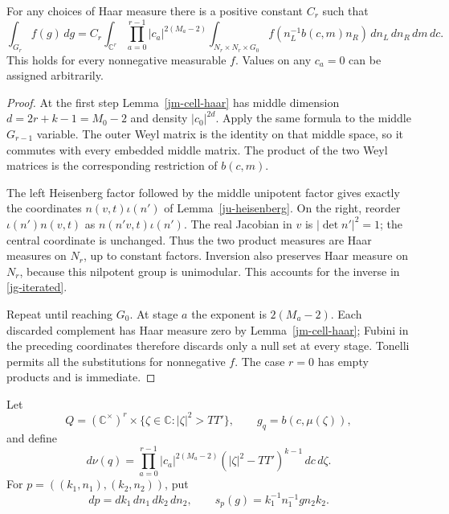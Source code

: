 \begin{proposition}\label{jg-full-cell}
For any choices of Haar measure there is a positive constant
\(C_r\) such that
\begin{equation}\label{jg-iterated}
 \int_{G_r}f(g)\,dg
 =C_r\int_{\mathbb C^r}
      \prod_{a=0}^{r-1}|c_a|^{2(M_a-2)}
      \int_{N_r\times N_r\times G_0}
          f(n_L^{-1}b(c,m)n_R)\,dn_L\,dn_R\,dm\,dc .
\end{equation}
This holds for every nonnegative measurable \(f\).
Values on any \(c_a=0\) can be assigned arbitrarily.
\end{proposition}

\begin{proof}
At the first step Lemma~\ref{jm-cell-haar} has middle dimension
\(d=2r+k-1=M_0-2\) and density \(|c_0|^{2d}\).
Apply the same formula to the middle \(G_{r-1}\) variable.
The outer Weyl matrix is the identity on that middle space,
so it commutes with every embedded middle matrix.
The product of the two Weyl matrices is the corresponding
restriction of \(b(c,m)\).

The left Heisenberg factor followed by the middle unipotent
factor gives exactly the coordinates
\(n(v,t)\iota(n')\) of Lemma~\ref{ju-heisenberg}.
On the right, reorder
\(\iota(n')n(v,t)\) as
\(n(n'v,t)\iota(n')\).
The real Jacobian in \(v\) is
\(|\det n'|^2=1\); the central coordinate is unchanged.
Thus the two product measures are Haar measures on \(N_r\),
up to constant factors.  Inversion also preserves Haar measure
on \(N_r\), because this nilpotent group is unimodular.
This accounts for the inverse in \eqref{jg-iterated}.

Repeat until reaching \(G_0\).
At stage \(a\) the exponent is \(2(M_a-2)\).
Each discarded complement has Haar measure zero by
Lemma~\ref{jm-cell-haar}; Fubini in the preceding coordinates
therefore discards only a null set at every stage.
Tonelli permits all the substitutions for nonnegative \(f\).
The case \(r=0\) has empty products and is immediate.
\end{proof}

Let
\[
 Q=(\mathbb C^\times)^r\times
                    \{\zeta\in\mathbb C:|\zeta|^2>TT'\},
 \qquad g_q=b(c,\mu(\zeta)),
\]
and define
\begin{equation}\label{jg-radial-measure}
 d\nu(q)=
    \prod_{a=0}^{r-1}|c_a|^{2(M_a-2)}
          (|\zeta|^2-TT')^{k-1}\,dc\,d\zeta .
\end{equation}
For \(p=((k_1,n_1),(k_2,n_2))\), put
\[
 dp=dk_1\,dn_1\,dk_2\,dn_2,\qquad
                s_p(g)=k_1^{-1}n_1^{-1}g n_2k_2 .
\]

